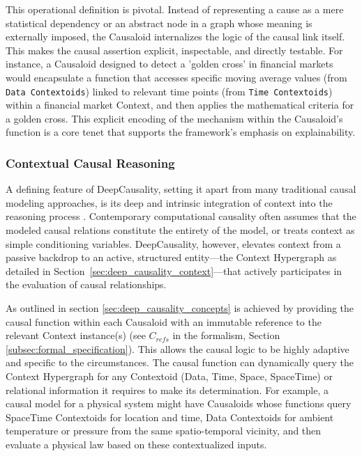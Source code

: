This operational definition is pivotal. Instead of representing a cause as a mere statistical dependency or an abstract node in a graph whose meaning is externally imposed, the Causaloid internalizes the logic of the causal link itself. This makes the causal assertion explicit, inspectable, and directly testable. For instance, a Causaloid designed to detect a 'golden cross' in financial markets would encapsulate a function that accesses specific moving average values (from \texttt{Data Contextoids}) linked to relevant time points (from \texttt{Time Contextoids}) within a financial market Context, and then applies the mathematical criteria for a golden cross. This explicit encoding of the mechanism within the Causaloid's function is a core tenet that supports the framework's emphasis on explainability.

\subsubsection{Contextual Causal Reasoning}
\label{subsubsec:contextual_causal_reasoning}

A defining feature of DeepCausality, setting it apart from many traditional causal modeling approaches, is its deep and intrinsic integration of context into the reasoning process \cite{DeepCausalityWebsite}. Contemporary computational causality often assumes that the modeled causal relations constitute the entirety of the model, or treats context as simple conditioning variables. DeepCausality, however, elevates context from a passive backdrop to an active, structured entity---the Context Hypergraph as detailed in Section~\ref{sec:deep_causality_context}---that actively participates in the evaluation of causal relationships.

As outlined in section \ref{sec:deep_causality_concepts} is achieved by providing the causal function within each Causaloid with an immutable reference to the relevant Context instance(s) (see $C_{refs}$ in the formalism, Section \ref{subsec:formal_specification}). This allows the causal logic to be highly adaptive and specific to the circumstances. The causal function can dynamically query the Context Hypergraph for any Contextoid (Data, Time, Space, SpaceTime) or relational information it requires to make its determination. For example, a causal model for a physical system might have Causaloids whose functions query SpaceTime Contextoids for location and time, Data Contextoids for ambient temperature or pressure from the same spatio-temporal vicinity, and then evaluate a physical law based on these contextualized inputs.

